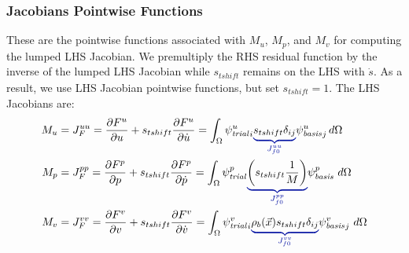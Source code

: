 \subsubsection{Jacobians Pointwise Functions}

These are the pointwise functions associated with $M_{u}$, $M_{p}$,
and $M_{v}$ for computing the lumped LHS Jacobian. We premultiply the
RHS residual function by the inverse of the lumped LHS Jacobian while
$s_\mathit{tshift}$ remains on the LHS with $\dot{s}$. As a result,
we use LHS Jacobian pointwise functions, but set $s_\mathit{tshift} = 1$. The
LHS Jacobians are:
\begin{align}
M_{u} &= J_F^{uu} = \frac{\partial F^u}{\partial u} + s_{tshift} \frac{\partial F^u}{\partial \dot{u}} =
\int_{\Omega} \trialscalar[u]_{i} \eqnannotate{s_{tshift} \delta_{ij}}{J^{uu}_{f0}} \basisscalar[u]_{j} \, d \Omega \\
M_{p} &= J_F^{pp} = \frac{\partial F^p}{\partial p} + s_{tshift} \frac{\partial F^p}{\partial \dot{p}} =
\int_{\Omega} \trialscalar[p] \eqnannotate{\left(s_{tshift} \frac{1}{M}\right)}{J_{f0}^{pp}} \basisscalar[p] \ d\Omega \\
M_{v} &= J_F^{vv} = \frac{\partial F^v}{\partial v} + s_{tshift} \frac{\partial F^v}{\partial \dot{v}} =
\int_{\Omega} \trialscalar[v]_{i}\eqnannotate{\rho_{b}(\vec{x}) s_{tshift} \delta_{ij}}{J^{vv}_{f0}} \basisscalar[v]_{j} \  d \Omega
\end{align}
